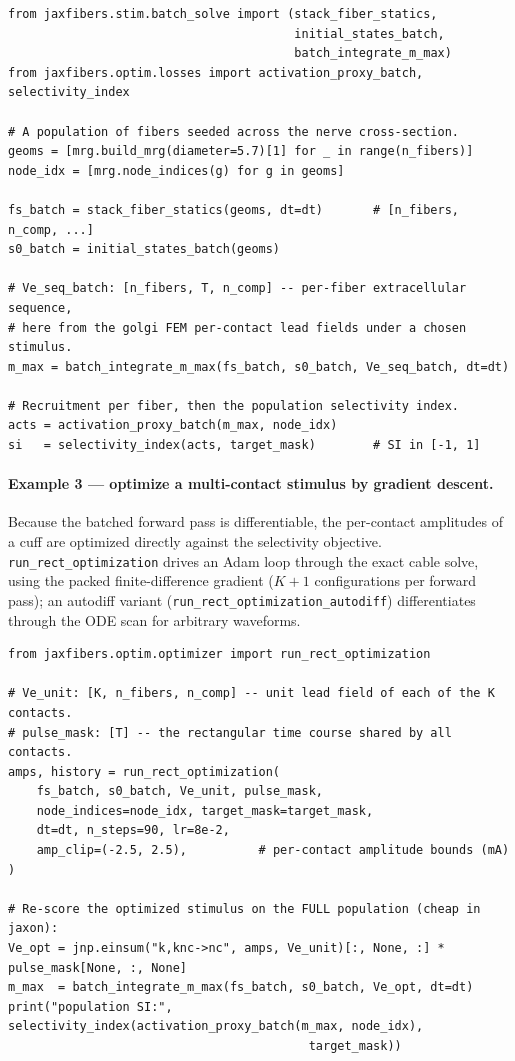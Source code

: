 \documentclass[preprint,12pt,a4paper]{elsarticle}
\begin{document}
{\footnotesize
\begin{verbatim}
from jaxfibers.stim.batch_solve import (stack_fiber_statics,
                                        initial_states_batch,
                                        batch_integrate_m_max)
from jaxfibers.optim.losses import activation_proxy_batch, selectivity_index

# A population of fibers seeded across the nerve cross-section.
geoms = [mrg.build_mrg(diameter=5.7)[1] for _ in range(n_fibers)]
node_idx = [mrg.node_indices(g) for g in geoms]

fs_batch = stack_fiber_statics(geoms, dt=dt)       # [n_fibers, n_comp, ...]
s0_batch = initial_states_batch(geoms)

# Ve_seq_batch: [n_fibers, T, n_comp] -- per-fiber extracellular sequence,
# here from the golgi FEM per-contact lead fields under a chosen stimulus.
m_max = batch_integrate_m_max(fs_batch, s0_batch, Ve_seq_batch, dt=dt)

# Recruitment per fiber, then the population selectivity index.
acts = activation_proxy_batch(m_max, node_idx)
si   = selectivity_index(acts, target_mask)        # SI in [-1, 1]
\end{verbatim}
}

\paragraph{Example 3 --- optimize a multi-contact stimulus by gradient descent.}
Because the batched forward pass is differentiable, the per-contact amplitudes of a cuff are
optimized directly against the selectivity objective. \texttt{run\_rect\_optimization} drives an
Adam loop through the exact cable solve, using the packed finite-difference gradient
($K{+}1$ configurations per forward pass); an autodiff variant
(\texttt{run\_rect\_optimization\_autodiff}) differentiates through the ODE scan for arbitrary
waveforms.

{\footnotesize
\begin{verbatim}
from jaxfibers.optim.optimizer import run_rect_optimization

# Ve_unit: [K, n_fibers, n_comp] -- unit lead field of each of the K contacts.
# pulse_mask: [T] -- the rectangular time course shared by all contacts.
amps, history = run_rect_optimization(
    fs_batch, s0_batch, Ve_unit, pulse_mask,
    node_indices=node_idx, target_mask=target_mask,
    dt=dt, n_steps=90, lr=8e-2,
    amp_clip=(-2.5, 2.5),          # per-contact amplitude bounds (mA)
)

# Re-score the optimized stimulus on the FULL population (cheap in jaxon):
Ve_opt = jnp.einsum("k,knc->nc", amps, Ve_unit)[:, None, :] * pulse_mask[None, :, None]
m_max  = batch_integrate_m_max(fs_batch, s0_batch, Ve_opt, dt=dt)
print("population SI:", selectivity_index(activation_proxy_batch(m_max, node_idx),
                                          target_mask))
\end{verbatim}
}
\end{document}
